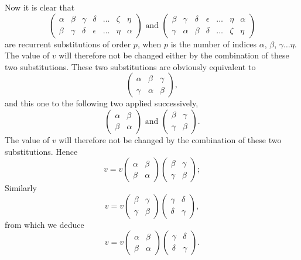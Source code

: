 \documentclass[oneside, 12 pt, leqno]{memoir}
\begin{document}
Now it is clear that
\[ \left(\begin{array}{ccccccc}\alpha & \beta & \gamma & \delta & \dots & \zeta & \eta \\\beta & \gamma & \delta & \epsilon & \dots & \eta & \alpha\end{array}\right) \text{ and } \left(\begin{array}{ccccccc}\beta & \gamma & \delta & \epsilon & \dots & \eta & \alpha\\\gamma & \alpha & \beta & \delta & \dots & \zeta & \eta \end{array}\right)\]
are recurrent substitutions of order \(p\), when \(p\) is the number of indices \(\alpha\), \(\beta\), \(\gamma \dots \eta\). The value of \(v\) will therefore not be changed either by the combination of these two substitutions. These two substitutions are obviously equivalent to
\[\left(\begin{array}{ccc} \alpha & \beta & \gamma \\ \gamma & \alpha & \beta\end{array}\right),\]
and this one to the following two applied successively,
\[\left(\begin{array}{cc}\alpha & \beta \\\beta & \alpha\end{array}\right) \text{ and }\left(\begin{array}{cc}\beta & \gamma \\\gamma & \beta\end{array}\right).\]
The value of \(v\) will therefore not be changed by the combination of these two substitutions. Hence
\[v=v\left(\begin{array}{cc}\alpha & \beta \\\beta & \alpha\end{array}\right)\left(\begin{array}{cc}\beta & \gamma \\\gamma & \beta\end{array}\right);\]
Similarly
\[v=v\left(\begin{array}{cc}\beta & \gamma \\\gamma & \beta\end{array}\right)\left(\begin{array}{cc}\gamma & \delta \\\delta & \gamma \end{array}\right),\]
from which we deduce
\[v=v\left(\begin{array}{cc}\alpha & \beta \\\beta & \alpha\end{array}\right)\left(\begin{array}{cc}\gamma & \delta \\\delta & \gamma
\end{array}\right).\]
\end{document}
